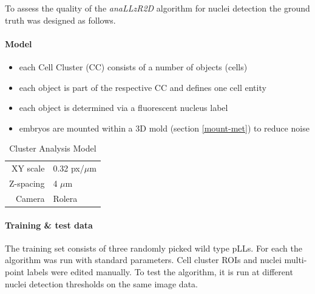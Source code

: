 \documentclass[11pt,singlespacinge,twoside]{reedthesis} %
\providecommand{\tightlist}{%
  \setlength{\itemsep}{0pt}\setlength{\parskip}{0pt}}
\theoremstyle{definition}
\theoremstyle{definition}
\theoremstyle{definition}
\theoremstyle{remark}
\begin{document}
To assess the quality of the \emph{anaLLzR2D} algorithm for nuclei detection the ground truth was designed as follows.

\hypertarget{model}{%
\paragraph{Model}\label{model}}
\begin{itemize}
\tightlist
\item
  each Cell Cluster (CC) consists of a number of objects (cells)
\item
  each object is part of the respective CC and defines one cell entity
\item
  each object is determined via a fluorescent nucleus label
\item
  embryos are mounted within a 3D mold (section \ref{mount-met}) to reduce noise
\end{itemize}
\begin{longtable}[]{@{}rl@{}}
\caption{\label{tab:imgcond3DGrT} Cluster Analysis Model}\tabularnewline
\toprule
\endhead
\begin{minipage}[t]{0.46\columnwidth}\raggedleft
XY scale\strut
\end{minipage} & \begin{minipage}[t]{0.46\columnwidth}\raggedright
0.32 px/\(\mu\)m\strut
\end{minipage}\tabularnewline
\begin{minipage}[t]{0.46\columnwidth}\raggedleft
Z-spacing\strut
\end{minipage} & \begin{minipage}[t]{0.46\columnwidth}\raggedright
4 \(\mu\)m\strut
\end{minipage}\tabularnewline
\begin{minipage}[t]{0.46\columnwidth}\raggedleft
Camera\strut
\end{minipage} & \begin{minipage}[t]{0.46\columnwidth}\raggedright
Rolera\strut
\end{minipage}\tabularnewline
\bottomrule
\end{longtable}
\pagebreak

\hypertarget{training-test-data}{%
\paragraph{Training \& test data}\label{training-test-data}}

The training set consists of three randomly picked wild type pLLs. For each the algorithm was run with standard parameters. Cell cluster ROIs and nuclei multi-point labels were edited manually. To test the algorithm, it is run at different nuclei detection thresholds on the same image data.
\end{document}
